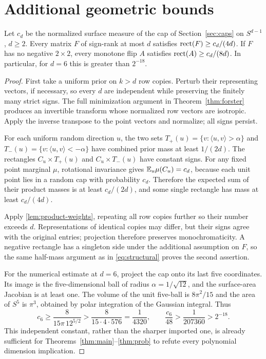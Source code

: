 \section{Additional geometric bounds}\label{app:oldgeometry}

\begin{proposition}\label{prop:cap-bound}
Let $c_d$ be the normalized surface measure of the cap of Section~\ref{sec:caps} on $S^{d-1}$, $d\ge2$. Every matrix $F$ of sign-rank at most $d$ satisfies $\operatorname{rect}(F)\ge c_d/(4d)$. If $F$ has no negative $2\times2$, every monotone flip $A$ satisfies $\operatorname{rect}(A)\ge c_d/(8d)$. In particular, for $d=6$ this is greater than $2^{-18}$.
\end{proposition}

\begin{proof}
First take a uniform prior on $k>d$ row copies. Perturb their representing vectors, if necessary, so every $d$ are independent while preserving the finitely many strict signs. The full minimization argument in Theorem~\ref{thm:forster} produces an invertible transform whose normalized row vectors are isotropic. Apply the inverse transpose to the point vectors and normalize; all signs persist.

For each uniform random direction $u$, the two sets $T_+(u)=\{v:\langle u,v\rangle>\alpha\}$ and $T_-(u)=\{v:\langle u,v\rangle<-\alpha\}$ have combined prior mass at least $1/(2d)$. The rectangles $C_u\times T_+(u)$ and $C_u\times T_-(u)$ have constant signs. For any fixed point marginal $\mu$, rotational invariance gives $\mathbb E_u\mu(C_u)=c_d$, because each unit point lies in a random cap with probability $c_d$. Therefore the expected sum of their product masses is at least $c_d/(2d)$, and some single rectangle has mass at least $c_d/(4d)$.

Apply \cref{lem:product-weights}, repeating all row copies further so their number exceeds $d$. Representations of identical copies may differ, but their signs agree with the original entries; projection therefore preserves monochromaticity. A negative rectangle has a singleton side under the additional assumption on $F$, so the same half-mass argument as in \eqref{eq:structural} proves the second assertion.

For the numerical estimate at $d=6$, project the cap onto its last five coordinates. Its image is the five-dimensional ball of radius $\alpha=1/\sqrt{12}$, and the surface-area Jacobian is at least one. The volume of the unit five-ball is $8\pi^2/15$ and the area of $S^5$ is $\pi^3$, obtained by polar integration of the Gaussian integral. Thus
\[
 c_6\ge\frac8{15\pi\,12^{5/2}}>
 \frac8{15\cdot4\cdot576}=\frac1{4320},
 \qquad \frac{c_6}{48}>\frac1{207360}>2^{-18}.
\]
This independent constant, rather than the sharper imported one, is already sufficient for Theorems~\ref{thm:main}--\ref{thm:prob} to refute every polynomial dimension implication.
\end{proof}

